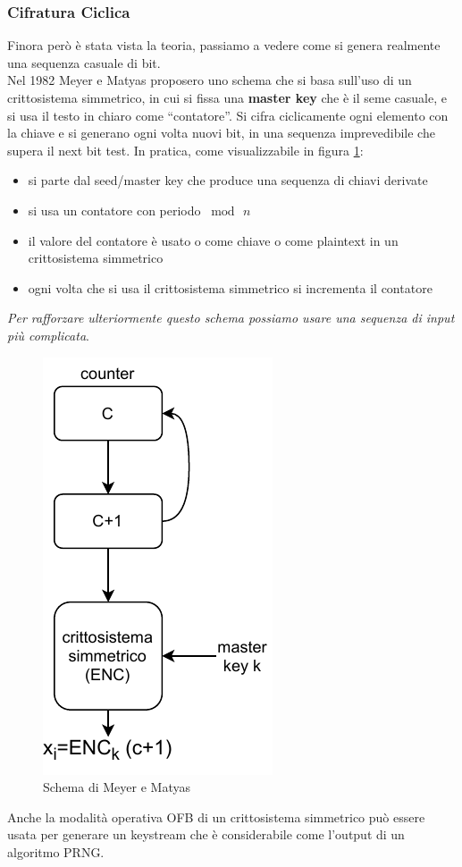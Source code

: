 \documentclass[a4paper,12pt, oneside]{book}
\begin{document}
\subsubsection{Cifratura Ciclica}
Finora però è stata vista la teoria, passiamo a vedere come si genera realmente
una sequenza casuale di bit.\\
Nel 1982 Meyer e Matyas proposero uno schema che si basa sull'uso di un
crittosistema simmetrico, in cui si fissa una \textbf{master key} che è il seme
casuale, e si usa il testo in chiaro come ``contatore''. Si cifra ciclicamente
ogni elemento con la chiave e si generano ogni volta nuovi bit, in una sequenza
imprevedibile che supera il next bit test. In pratica, come visualizzabile in
figura \ref{fig:prng}:
\begin{itemize}
  \item si parte dal seed/master key che produce una sequenza di chiavi derivate
  \item si usa un contatore con periodo $\bmod \,n$
  \item il valore del contatore è usato o come chiave o come plaintext in un
  crittosistema simmetrico 
  \item ogni volta che si usa il crittosistema simmetrico si incrementa il
  contatore
\end{itemize}
\textit{Per rafforzare ulteriormente questo schema possiamo usare una sequenza
  di input più complicata}. 
\begin{figure}
  \centering
  \includegraphics[scale = 0.8]{img/prng.pdf}
  \caption{Schema di Meyer e Matyas}
  \label{fig:prng}
\end{figure}
Anche la modalità operativa OFB di un crittosistema simmetrico può essere usata
per generare un keystream che è considerabile come l'output di un algoritmo
PRNG.\\
\end{document}
